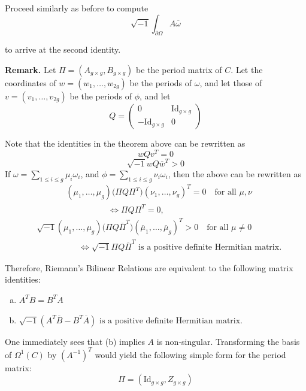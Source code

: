 \documentclass[11pt,a4paper]{article}
\begin{document}
Proceed similarly as before to compute
$$\sqrt{-1}\int_{\partial\Omega}A\overline{\omega}$$

to arrive at the second identity.

\textbf{Remark.} Let $\Pi = (A_{g\times g}, B_{g\times g})$ be the period matrix of $C$. Let the coordinates of $w=(w_1,\ldots,w_{2g})$ be the periods of $\omega$, and let those of $v=(v_1,\ldots,v_{2g})$ be the periods of $\phi$, and let
$$Q = \begin{pmatrix} 0&\text{Id}_{g\times g}\\-\text{Id}_{g\times g}&0
\end{pmatrix}$$

Note that the identities in the theorem above can be rewritten as
$$wQv^T = 0$$
$$\sqrt{-1}wQ\overline{w}^T > 0$$
If $\omega = \sum_{1\leq i\leq g}\mu_i\omega_i$, and $\phi = \sum_{1\leq i\leq g}\nu_i\omega_i$, then the above can be rewritten as
\[
\begin{aligned}
& (\mu_1,\ldots,\mu_g)\big(\Pi Q\Pi^T\big)
  (\nu_1,\ldots,\nu_g)^T=0
  \quad\text{for all $\mu,\nu$}\\
&\hspace{5em}\iff \Pi Q\Pi^T=0,
\end{aligned}
\]
\[
\begin{aligned}
& \sqrt{-1}(\mu_1,\ldots,\mu_g)
  \big(\Pi Q\overline{\Pi}^T\big)
  (\overline{\mu}_1,\ldots,\overline{\mu}_g)^T>0
  \quad\text{for all $\mu\ne0$}\\
&\hspace{5em}\iff
  \sqrt{-1}\Pi Q\overline{\Pi}^T
  \text{ is a positive definite Hermitian matrix}.
\end{aligned}
\]

Therefore, Riemann's Bilinear Relations are equivalent to the following matrix identities:
\begin{enumerate}[(a)]
    \item $A^TB = B^TA$
    \item $\sqrt{-1}(A^T\overline{B} - B^T\overline{A}) \text{ is a positive definite Hermitian matrix}$.
\end{enumerate}

One immediately sees that (b) implies $A$ is non-singular. Transforming the basis of $\Omega^1(C)$ by $(A^{-1})^T$ would yield the following simple form for the period matrix:
$$\Pi = (\text{Id}_{g\times g}, Z_{g\times g})$$
\end{document}
